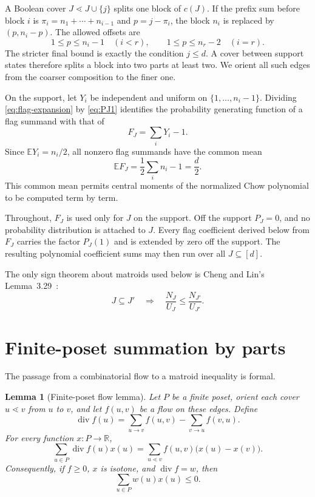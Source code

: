 \documentclass[11pt]{amsart}
\newtheorem{lemma}[theorem]{Lemma}
\theoremstyle{definition}
\theoremstyle{remark}
\newcommand{\divg}{\operatorname{div}}
\newcommand{\E}{\mathbb E}
\begin{document}
A Boolean cover $J\lessdot J\cup\{j\}$ splits one block of $c(J)$.
If the prefix sum before block $i$ is
$\pi_i=n_1+\cdots+n_{i-1}$ and $p=j-\pi_i$, the block $n_i$ is
replaced by $(p,n_i-p)$.  The allowed offsets are
\[
 1\le p\le n_i-1\quad(i<r),\qquad
 1\le p\le n_r-2\quad(i=r).
\]
The stricter final bound is exactly the condition $j\le d$.  A cover
between support states therefore splits a block into two parts at least two.
We orient all such edges from the coarser composition to the finer one.

On the support, let $Y_i$ be independent and uniform on
$\{1,\ldots,n_i-1\}$.  Dividing \eqref{eq:flag-expansion} by
\eqref{eq:PJ1} identifies the probability generating function of a flag
summand with that of
\begin{equation}
 F_J=\sum_iY_i-1.
 \label{eq:FJ}
\end{equation}
Since $\E Y_i=n_i/2$, all nonzero flag summands have the common mean
\begin{equation}
 \E F_J=\frac12\sum_i n_i-1=\frac d2.
 \label{eq:common-mean}
\end{equation}
This common mean permits central moments of the normalized Chow polynomial
to be computed term by term.

Throughout, $F_J$ is used only for $J$ on the support.  Off the support
$P_J=0$, and no probability distribution is attached to $J$.  Every flag
coefficient derived below from $F_J$ carries the factor $P_J(1)$ and is
extended by zero off the support.  The resulting polynomial coefficient sums
may then run over all $J\subseteq[d]$.

The only sign theorem about matroids used below is Cheng and Lin's
Lemma~3.29~\cite[p.~22]{ChengLin}:
\begin{equation}
 J\subseteq J'\quad\Longrightarrow\quad
 \frac{N_J}{U_J}\le\frac{N_{J'}}{U_{J'}}.
 \label{eq:CL-monotonicity}
\end{equation}

\section{Finite-poset summation by parts}
\label{sec:poset}

The passage from a combinatorial flow to a matroid inequality is formal.

\begin{lemma}[Finite-poset flow lemma]
\label{lem:poset-flow}
Let $P$ be a finite poset, orient each cover $u\lessdot v$ from $u$
to $v$, and let $f(u,v)$ be a flow on these edges.  Define
\[
 \divg f(u)=\sum_{u\to v}f(u,v)-\sum_{v\to u}f(v,u).
\]
For every function $x:P\to\mathbb R$,
\begin{equation}
 \sum_{u\in P}\divg f(u)x(u)
 =\sum_{u\lessdot v}f(u,v)\bigl(x(u)-x(v)\bigr).
 \label{eq:summation-by-parts}
\end{equation}
Consequently, if $f\ge0$, $x$ is isotone, and
$\divg f=w$, then
\[
 \sum_{u\in P}w(u)x(u)\le0.
\]
\end{lemma}
\end{document}
